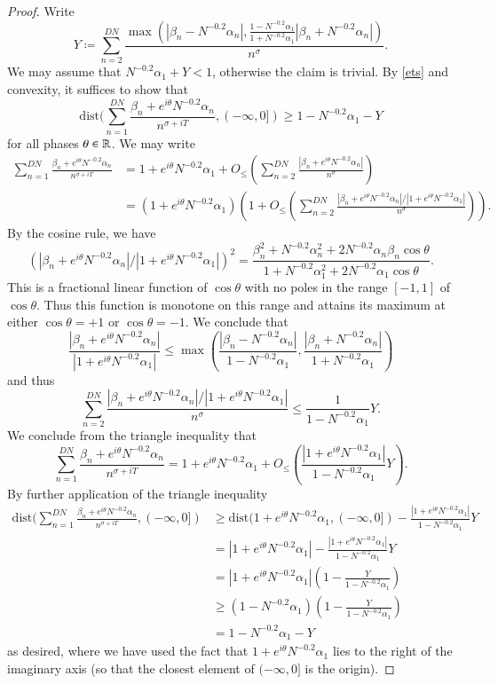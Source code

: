 \begin{proof}
Write 
$$ Y \coloneqq \sum_{n=2}^{DN} \frac{\max(|\beta_n-N^{-0.2} \alpha_n|, \frac{1-N^{-0.2} \alpha_1}{1+N^{-0.2} \alpha_1} |\beta_n+N^{-0.2} \alpha_n|)}{n^{\sigma}}.$$
We may assume that $N^{-0.2} \alpha_1+Y < 1$, otherwise the claim is trivial.  By \eqref{ets} and convexity, it suffices to show that
$$
\mathrm{dist}( \sum_{n=1}^{DN} \frac{\beta_n + e^{i\theta} N^{-0.2} \alpha_n}{n^{\sigma+iT}}, (-\infty,0]) \geq 1 - N^{-0.2} \alpha_1 - Y$$
for all phases $\theta \in \mathbb{R}$.  We may write
\begin{align*}
\sum_{n=1}^{DN} \frac{\beta_n + e^{i\theta} N^{-0.2} \alpha_n}{n^{\sigma+iT}} &= 1 + e^{i\theta} N^{-0.2} \alpha_1 + O_{\leq}( \sum_{n=2}^{DN}
\frac{|\beta_n + e^{i\theta} N^{-0.2} \alpha_n|}{n^{\sigma}} ) \\
&=
(1 + e^{i\theta} N^{-0.2} \alpha_1) (1 + O_{\leq}( \sum_{n=2}^{DN}
\frac{|\beta_n + e^{i\theta} N^{-0.2} \alpha_n|/|1+e^{i\theta} N^{-0.2} \alpha_1|}{n^{\sigma}} ) ).
\end{align*}
By the cosine rule, we have
$$ \left(|\beta_n + e^{i\theta} N^{-0.2} \alpha_n| / |1 + e^{i\theta} N^{-0.2} \alpha_1|\right)^2 = \frac{\beta_n^2 + N^{-0.2} \alpha_n^2 + 2 N^{-0.2} \alpha_n \beta_n \cos \theta}{1 + N^{-0.2} \alpha_1^2 + 2 N^{-0.2} \alpha_1 \cos \theta}.$$
This is a fractional linear function of $\cos \theta$ with no poles in the range $[-1,1]$ of $\cos \theta$.  Thus this function is monotone on this range and attains its maximum at either $\cos \theta=+1$ or $\cos \theta = -1$.  We conclude that
$$ \frac{|\beta_n + e^{i\theta} N^{-0.2} \alpha_n|}{|1 + e^{i\theta} N^{-0.2} \alpha_1|} \leq \max\left( \frac{|\beta_n-N^{-0.2} \alpha_n|}{1-N^{-0.2} \alpha_1}, \frac{|\beta_n+N^{-0.2} \alpha_n|}{1+N^{-0.2} \alpha_1} \right)$$
and thus
$$ \sum_{n=2}^{DN} \frac{|\beta_n + e^{i\theta} N^{-0.2} \alpha_n|/|1+e^{i\theta} N^{-0.2} \alpha_1|}{n^{\sigma}} \leq \frac{1}{1-N^{-0.2} \alpha_1} Y.$$
We conclude from the triangle inequality that
$$ \sum_{n=1}^{DN} \frac{\beta_n + e^{i\theta} N^{-0.2} \alpha_n}{n^{\sigma+iT}} = 1 + e^{i\theta} N^{-0.2} \alpha_1 + O_{\leq}( \frac{|1+e^{i\theta} N^{-0.2} \alpha_1|}{1-N^{-0.2} \alpha_1} Y ).$$
By further application of the triangle inequality
\begin{align*}
\mathrm{dist}( \sum_{n=1}^{DN} \frac{\beta_n + e^{i\theta} N^{-0.2} \alpha_n}{n^{\sigma+iT}}, (-\infty,0]) &\geq \mathrm{dist}( 1 + e^{i\theta} N^{-0.2} \alpha_1, (-\infty,0]) - \frac{|1+e^{i\theta} N^{-0.2} \alpha_1|}{1-N^{-0.2} \alpha_1} Y \\
&= |1 + e^{i\theta} N^{-0.2} \alpha_1| - \frac{|1+e^{i\theta} N^{-0.2} \alpha_1|}{1-N^{-0.2} \alpha_1} Y  \\
&= |1 + e^{i\theta} N^{-0.2} \alpha_1| (1 - \frac{Y}{1-N^{-0.2} \alpha_1} ) \\
&\geq (1-N^{-0.2} \alpha_1) (1 - \frac{Y}{1-N^{-0.2} \alpha_1} ) \\
&= 1 - N^{-0.2} \alpha_1 - Y
\end{align*}
as desired, where we have used the fact that $1+e^{i\theta} N^{-0.2} \alpha_1$ lies to the right of the imaginary axis (so that the closest element of $(-\infty,0]$ is the origin).
\end{proof}

